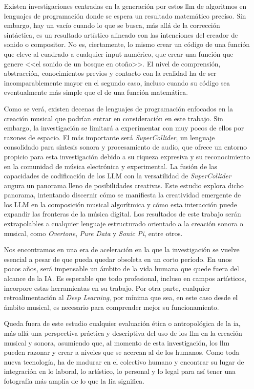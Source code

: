 Existen investigaciones centradas en la generación por estos \gls{llm} de algoritmos en lenguajes de programación donde se espera un resultado matemático preciso. Sin embargo, hay un vacío cuando lo que se busca, más allá de la corrección sintáctica, es un resultado artístico alineado con las intenciones del creador de sonido o compositor. No es, ciertamente, lo mismo crear un código de una función que eleve al cuadrado a cualquier input numérico, que crear una función que genere <<el sonido de un bosque en otoño>>. El nivel de comprensión, abstracción, conocimientos previos y contacto con la realidad ha de ser incomparablemente mayor en el segundo caso, incluso cuando su código sea eventualmente más simple que el de una función matemática.

Como se verá, existen decenas de lenguajes de programación enfocados en la creación musical que podrían entrar en consideración en este trabajo. Sin embargo, la investigación se limitará a experimentar con muy pocos de ellos por razones de espacio. El más importante será \textit{SuperCollider}, un lenguaje consolidado para síntesis sonora y procesamiento de audio, que ofrece un entorno propicio para esta investigación debido a su riqueza expresiva y su reconocimiento en la comunidad de música electrónica y experimental. La fusión de las capacidades de codificación de los LLM con la versatilidad de \textit{SuperCollider} augura un panorama lleno de posibilidades creativas. Este estudio explora dicho panorama, intentando discernir cómo se manifiesta la creatividad emergente de los LLM en la composición musical algorítmica y cómo esta interacción puede expandir las fronteras de la música digital. Los resultados de este trabajo serán extrapolables a cualquier lenguaje estructurado orientado a la creación sonora o musical, como \textit{Overtone}, \textit{Pure Data} y \textit{Sonic Pi}, entre otros.

Nos encontramos en una era de aceleración en la que la investigación se vuelve esencial a pesar de que pueda quedar obsoleta en un corto período. En unos pocos años, será impensable un ámbito de la vida humana que quede fuera del alcance de la IA. Es esperable que todo profesional, incluso en campos artísticos, incorpore estas herramientas en su trabajo. Por otra parte, cualquier retroalimentación al \textit{Deep Learning}, por mínima que sea, en este caso desde el ámbito musical, es necesario para comprender mejor su funcionamiento.

Queda fuera de este estudio cualquier evaluación ética o antropológica de la \gls{ia}, más allá una perspectiva práctica y descriptiva del uso de los \gls{llm} en la creación musical y sonora, asumiendo que, al momento de esta investigación, los \gls{llm} pueden razonar y crear a niveles que se acercan al de los humanos. Como toda nueva tecnología, ha de madurar en el colectivo humano y encontrar su lugar de integración en lo laboral, lo artístico, lo personal y lo legal para así tener una fotografía más amplia de lo que la I\gls{ia} significa. 

